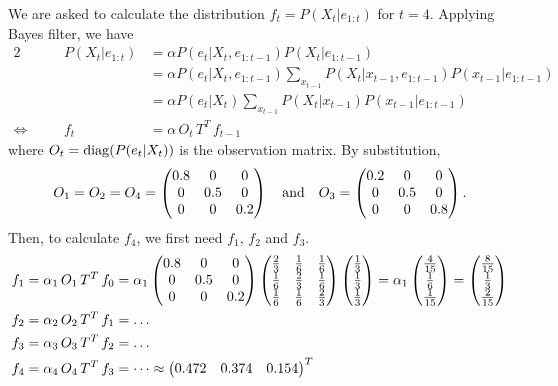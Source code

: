 \documentclass[11pt, a4paper]{article}
\begin{document}
\begin{enumerate}
    \begin{solution}
        We are asked to calculate the distribution $f_t = P(X_t | e_{1:t})$ for $t = 4$. Applying Bayes filter, we have
        \begin{alignat*}{2}
            && P(X_t | e_{1:t}) & = \alpha P(e_t | X_t, e_{1:t-1}) P(X_t | e_{1:t-1}) \\
            &&& = \alpha P(e_t | X_t, e_{1:t-1}) \sum_{x_{t-1}} P(X_t | x_{t-1}, e_{1:t-1}) P(x_{t-1} | e_{1:t-1}) \\
            &&& = \alpha P(e_t | X_t) \sum_{x_{t-1}} P(X_t | x_{t-1}) P(x_{t-1} | e_{1:t-1}) \\
            \Leftrightarrow \quad && f_t & = \alpha \, O_t \, T^T \, f_{t-1}
        \end{alignat*}
        where $O_t = \operatorname{diag}(P(e_t | X_t))$ is the observation matrix. By substitution,
        \begin{equation*}
                O_1 = O_2 = O_4 = \begin{pmatrix}0.8 & 0 & 0 \\ 0 & 0.5 & 0 \\ 0 & 0 & 0.2\end{pmatrix} \quad \text{and} \quad O_3 = \begin{pmatrix}0.2 & 0 & 0 \\ 0 & 0.5 & 0 \\ 0 & 0 & 0.8\end{pmatrix} .
        \end{equation*}
        Then, to calculate $f_4$, we first need $f_1$, $f_2$ and $f_3$.
        \begin{align*}
            f_1 & = \alpha_1 \, O_1 \, T^T \, f_0 = \alpha_1 \begin{pmatrix}0.8 & 0 & 0 \\ 0 & 0.5 & 0 \\ 0 & 0 & 0.2\end{pmatrix} \begin{pmatrix}
                \frac{2}{3} & \frac{1}{6} & \frac{1}{6} \\
                \frac{1}{6} & \frac{2}{3} & \frac{1}{6} \\
                \frac{1}{6} & \frac{1}{6} & \frac{2}{3}
            \end{pmatrix} \begin{pmatrix}\frac{1}{3} \\ \frac{1}{3} \\ \frac{1}{3}\end{pmatrix} = \alpha_1 \begin{pmatrix}\frac{4}{15} \\ \frac{1}{6} \\ \frac{1}{15}\end{pmatrix} = \begin{pmatrix}\frac{8}{15} \\ \frac{1}{3} \\ \frac{2}{15}\end{pmatrix} \\
            f_2 & = \alpha_2 \, O_2 \, T^T \, f_1 = \dots \\
            f_3 & = \alpha_3 \, O_3 \, T^T \, f_2 = \dots \\
            f_4 & = \alpha_4 \, O_4 \, T^T \, f_3 = \dots \approx \begin{pmatrix}0.472 & 0.374 & 0.154\end{pmatrix}^T
        \end{align*}
    \end{solution}


\end{enumerate}
\end{document}
